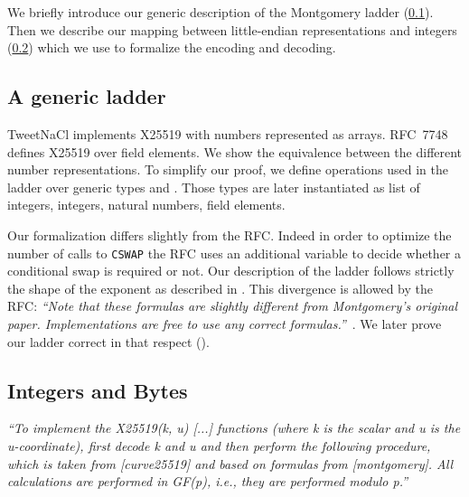 We briefly introduce our generic description of the Montgomery ladder (\ref{subsec:spec-ladder}).
Then we describe our mapping between little-endian representations and integers
(\ref{subsec:integer-bytes}) which we use to formalize the encoding and decoding.



\subsection{A generic ladder}
\label{subsec:spec-ladder}



TweetNaCl implements X25519 with numbers represented as arrays.
RFC~7748 defines X25519 over field elements. We show the equivalence between
the different number representations. To simplify our proof, we define operations
used in the ladder over generic types  and .
Those types are later instantiated as list of integers, integers, natural
numbers, field elements.


Our formalization differs slightly from the RFC. Indeed in order to optimize the
number of calls to \texttt{CSWAP} the RFC uses an additional variable to decide
whether a conditional swap is required or not. Our description of the ladder
follows strictly the shape of the exponent as described in .
This divergence is allowed by the RFC:
\emph{``Note that these formulas are slightly different from Montgomery's
original paper.  Implementations are free to use any correct formulas.''}~\cite{rfc7748}.
We later prove our ladder correct in that respect ().




\subsection{Integers and Bytes}
\label{subsec:integer-bytes}

\emph{``To implement the X25519(k, u) [...] functions (where k is
the scalar and u is the u-coordinate), first decode k and u and then
perform the following procedure, which is taken from [curve25519] and
based on formulas from [montgomery].  All calculations are performed
in GF(p), i.e., they are performed modulo p.''}~\cite{rfc7748}

